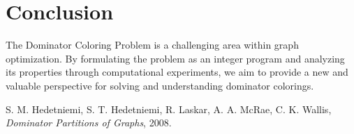 \documentclass[12pt]{article}
\begin{document}
\section{Conclusion}
The Dominator Coloring Problem is a challenging area within graph optimization. By formulating the problem as an integer program and analyzing its properties through computational experiments, we aim to provide a new and valuable perspective for solving and understanding dominator colorings.




\begin{thebibliography}{9}

S. M. Hedetniemi, S. T. Hedetniemi, R. Laskar, A. A. McRae, C. K. Wallis,
\textit{Dominator Partitions of Graphs}, 2008.

\end{thebibliography}
\end{document}
